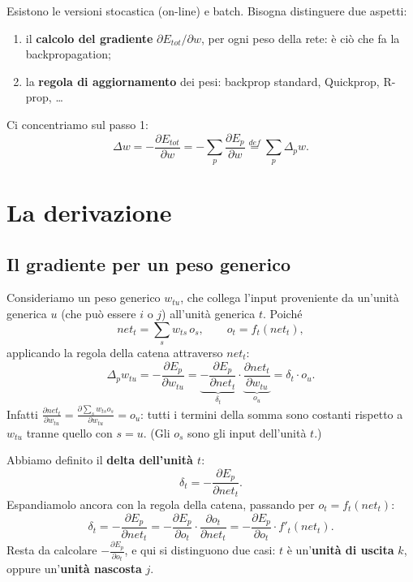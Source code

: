 Esistono le versioni stocastica (on-line) e batch. Bisogna distinguere
due aspetti:

\begin{enumerate}
\def\labelenumi{\arabic{enumi}.}
\tightlist
\item
  il \textbf{calcolo del gradiente} \(\partial E_{tot}/\partial w\), per
  ogni peso della rete: è ciò che fa la backpropagation;
\item
  la \textbf{regola di aggiornamento} dei pesi: backprop standard,
  Quickprop, R-prop, \ldots{}
\end{enumerate}

Ci concentriamo sul passo 1: \[
\Delta w = -\frac{\partial E_{tot}}{\partial w} = -\sum_p \frac{\partial E_p}{\partial w} \overset{def}{=} \sum_p \Delta_p w.
\]

\section{La derivazione}\label{la-derivazione}

\subsection{Il gradiente per un peso
generico}\label{il-gradiente-per-un-peso-generico}

Consideriamo un peso generico \(w_{tu}\), che collega l'input
proveniente da un'unità generica \(u\) (che può essere \(i\) o \(j\))
all'unità generica \(t\). Poiché \[
net_t = \sum_s w_{ts}\,o_s, \qquad o_t = f_t(net_t),
\] applicando la regola della catena attraverso \(net_t\): \[
\Delta_p w_{tu} = -\frac{\partial E_p}{\partial w_{tu}} = \underbrace{-\frac{\partial E_p}{\partial net_t}}_{\delta_t}\cdot\underbrace{\frac{\partial net_t}{\partial w_{tu}}}_{o_u} = \delta_t\cdot o_u.
\] Infatti
\(\frac{\partial net_t}{\partial w_{tu}} = \frac{\partial \sum_s w_{ts} o_s}{\partial w_{tu}} = o_u\):
tutti i termini della somma sono costanti rispetto a \(w_{tu}\) tranne
quello con \(s = u\). (Gli \(o_s\) sono gli input dell'unità \(t\).)

Abbiamo definito il \textbf{delta dell'unità \(t\)}: \[
\delta_t = -\frac{\partial E_p}{\partial net_t}.
\] Espandiamolo ancora con la regola della catena, passando per
\(o_t = f_t(net_t)\): \[
\delta_t = -\frac{\partial E_p}{\partial net_t} = -\frac{\partial E_p}{\partial o_t}\cdot\frac{\partial o_t}{\partial net_t} = -\frac{\partial E_p}{\partial o_t}\cdot f'_t(net_t).
\] Resta da calcolare \(-\frac{\partial E_p}{\partial o_t}\), e qui si
distinguono due casi: \(t\) è un'\textbf{unità di uscita} \(k\), oppure
un'\textbf{unità nascosta} \(j\).

